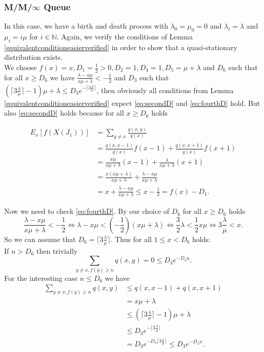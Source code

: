 \documentclass[12pt,a4paper]{scrartcl}
\numberwithin{equation}{section}
\newcommand{\N}{\mathbb{N}} %
\begin{document}
\subsubsection{M/M/$\infty$ Queue}
In this case, we have a birth and death process with $\lambda_0 = \mu_0 = 0$ and $\lambda_i = \lambda$ and $\mu_i = i \mu $ for $i \in \N.$
Again, we verify the conditions of Lemma \ref{equivalentconditioneasierverified} in order to show that a quasi-stationary distribution exists.\\[2em]
We choose $f\left(x\right)= x, D_1 = \frac{1}{2} > 0, D_2 = 1, D_4 = 1, D_5 = \mu + \lambda $ and $D_6$ such that for all $ x \geq D_6 $ we have $ \frac{\lambda - x\mu}{x\mu+ \lambda} < -\frac{1}{2}$ and $D_3$ such that $\left(\lceil 3 \frac{\lambda}{\mu} \rceil - 1 \right) \mu + \lambda \leq D_3 e^{- \lceil 3 \frac{\lambda}{\mu}\rceil}$, then obviously all conditions from Lemma \ref{equivalentconditioneasierverified} expect \eqref{eq:secondD} and \eqref{eq:fourthD} hold. But also \eqref{eq:secondD} holds because for all $ x \geq D_6 $ holds

\begin{align*}
E_x\left[f\left(X\left(J_1\right)\right)\right] &= \sum_{y \neq x} \frac{q\left(x,y\right)}{q\left(x\right)} \\
&= \frac{q\left(x,x-1\right)}{q\left(x\right)} f\left(x-1\right) + \frac{q\left(x,x+1\right)}{q\left(x\right)} f\left(x+1\right) \\
&=\frac{x\mu}{x\mu + \lambda} \left(x-1\right) + \frac{\lambda}{x\mu + \lambda} \left(x+1\right) \\
&= \frac{x\left(x\mu + \lambda \right)}{x\mu + \lambda} + \frac{\lambda - x\mu}{x\mu + \lambda} \\
&= x + \frac{\lambda - x \mu}{x \mu + \lambda} \leq x - \frac{1}{2} = f\left(x\right) - D_1.
\end{align*}

Now we need to check \eqref{eq:fourthD}. By our choice of $D_6$ for all $ x \geq D_6$ holds
\begin{equation*}
\frac{\lambda - x\mu}{x\mu + \lambda} < - \frac{1}{2} \iff
\lambda - x \mu < \left(- \frac{1}{2} \right) \left(x\mu + \lambda\right) \iff 
\frac{3}{2} \lambda < \frac{1}{2}x\mu \iff
3 \frac{\lambda}{\mu} < x.
\end{equation*}
So we can assume that $D_6 = \lceil 3 \frac{\lambda}{\mu}\rceil$. Thus for all $1 \leq x < D_6$ holds:\\[1em]
If $ n > D_6 $ then trivially 
$$ \sum_{y \neq x, f\left(y\right) \geq n} q\left(x,y\right) = 0 \leq D_3 e^{-D_4 n}. $$
For the interesting case $ n \leq D_6 $ we have
\begin{align*}
\sum_{y \neq x, f\left(y\right) \geq n} q\left(x,y\right) &\leq q\left(x,x-1\right) + q\left(x,x+1\right) \\
&= x\mu + \lambda \\
&\leq \left(\lceil 3 \frac{\lambda}{\mu}\rceil - 1 \right)\mu + \lambda \\
&\leq D_3 e^{- \lceil 3 \frac{\lambda}{\mu}\rceil} \\
&= D_3 e^{-D_4 \lceil 3 \frac{\lambda}{\mu}\rceil} \leq D_3 e^{-D_4 n}.
\end{align*}
\end{document}
